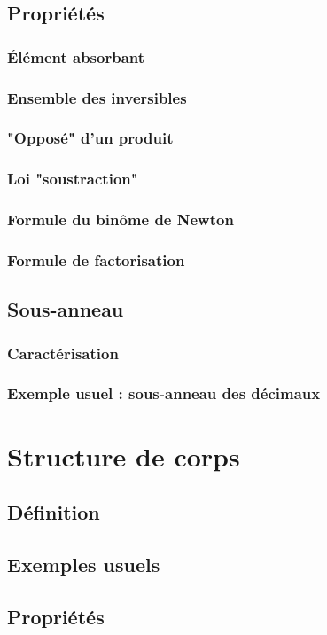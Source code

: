 \documentclass[12pt,a4paper,french]{book}
\begin{document}
		\subsection{Propriétés}
			\subsubsection{Élément absorbant}
			\subsubsection{Ensemble des inversibles}
			\subsubsection{"Opposé" d'un produit}
			\subsubsection{Loi "soustraction"}
			\subsubsection{Formule du binôme de Newton}
			\subsubsection{Formule de factorisation}
		\subsection{Sous-anneau}
			\subsubsection{Caractérisation}
			\subsubsection{Exemple usuel : sous-anneau des décimaux}
	\section{Structure de corps}
		\subsection{Définition}
		\subsection{Exemples usuels}
		\subsection{Propriétés}
\end{document}
